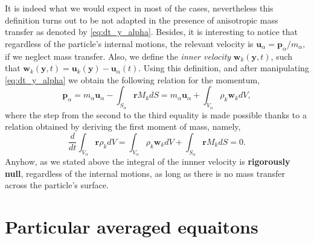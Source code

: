 \documentclass[twocolumn]{My_article}
\newcommand{\ddt}{\frac{d}{d t}}
\begin{document}
It is indeed what we would expect in most of the cases, nevertheless this definition turns out to be not adapted in the presence of anisotropic mass transfer as denoted by \ref{eq:dt_y_alpha}.
Besides, it is interesting to notice that regardless of the particle's internal motions, the relevant velocity is $\textbf{u}_\alpha = \textbf{p}_\alpha /m_\alpha,$ if we neglect mass transfer.
Also, we define the \textit{inner velocity} $\textbf{w}_k(\textbf{y},t)$, such that $\textbf{w}_k(\textbf{y},t) = \textbf{u}_k(\textbf{y}) - \textbf{u}_\alpha(t)$.
Using this definition, and after manipulating \ref{eq:dt_y_alpha} we obtain the following relation for the momentum,
\begin{equation}
    \textbf{p}_\alpha
    =  m_\alpha \textbf{u}_\alpha
    - \int_{S_\alpha} \textbf{r} M_k dS
    = m_\alpha \textbf{u}_\alpha
    + \int_{V_\alpha} \rho_k \textbf{w}_k dV,
    \label{eq:velocity_definition}
\end{equation}
where the step from the second to the third equality is made possible thanks to a relation obtained by deriving the first moment of mass, namely, 
\begin{equation}
    \label{eq:M_alpha_dt}
    \ddt \int_{V_\alpha} \textbf{r} \rho_k dV
    = \int_{V_\alpha} \rho_k  \textbf{w}_k  dV
    + \int_{S_\alpha} \textbf{r} M_k  dS = 0.
\end{equation}
Anyhow, as we stated above the integral of the innner velocity is \textbf{rigorously null}, regardless of the internal motions, as long as there is no mass transfer across the  particle's surface.

\section{Particular averaged equaitons}
\label{sec:Lagrange_to_Euler}
\end{document}
